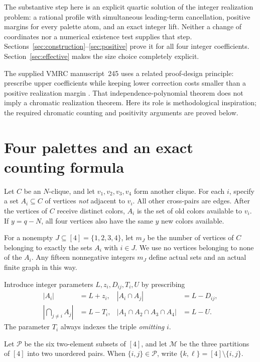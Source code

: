 \documentclass[11pt,a4paper]{article}
\theoremstyle{definition}
\newcommand{\pairs}{\mathcal P}
\newcommand{\parts}{\mathcal M}
\begin{document}
The substantive step here is an explicit quartic solution of the integer
realization problem: a rational profile with simultaneous leading-term
cancellation, positive margins for every palette atom, and an exact
integer lift. Neither a change of coordinates nor a numerical existence
test supplies that step. Sections~\ref{sec:construction}--\ref{sec:positive}
prove it for all four integer coefficients. Section~\ref{sec:effective}
makes the size choice completely explicit.

The supplied VMRC manuscript~245 uses a related proof-design principle:
prescribe upper coefficients while keeping lower correction costs smaller
than a positive realization margin \cite[Sections 2--3]{VMRC}. That
independence-polynomial theorem does not imply a chromatic realization
theorem. Here its role is methodological inspiration; the required
chromatic counting and positivity arguments are proved below.

\section{Four palettes and an exact counting formula}\label{sec:palettes}

Let $C$ be an $N$-clique, and let $v_1,v_2,v_3,v_4$ form another clique.
For each $i$, specify a set $A_i\subseteq C$ of vertices
\emph{not} adjacent to $v_i$. All other cross-pairs are edges. After the
vertices of $C$ receive distinct colors, $A_i$ is the set of old colors
available to $v_i$. If $y=q-N$, all four vertices also have the same
$y$ new colors available.

For a nonempty $J\subseteq[4]=\{1,2,3,4\}$, let $m_J$ be the
number of vertices of $C$ belonging to exactly the sets $A_i$ with
$i\in J$. We use no vertices belonging to none of the $A_i$.
Any fifteen nonnegative integers $m_J$ define actual sets and an actual
finite graph in this way.

Introduce integer parameters $L,z_i,D_{ij},T_i,U$ by prescribing
\begin{align}
 |A_i|&=L+z_i, & |A_i\cap A_j|&=L-D_{ij},\label{eq:intersections1}\\
 \left|\bigcap_{j\ne i}A_j\right|&=L-T_i,
 & |A_1\cap A_2\cap A_3\cap A_4|&=L-U.\label{eq:intersections2}
\end{align}
The parameter $T_i$ always indexes the triple \emph{omitting} $i$.

Let $\pairs$ be the six two-element subsets of $[4]$, and let $\parts$
be the three partitions of $[4]$ into two unordered pairs. When
$\{i,j\}\in\pairs$, write $\{k,\ell\}=[4]\setminus\{i,j\}$.
\end{document}
